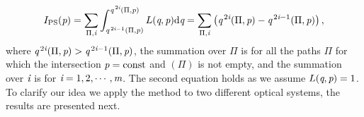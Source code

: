 \begin{equation}
I_{\textrm{PS}}(\textit{p}) = \sum_{\Pi, \textit{i} }\int_{\textit{q}^{\,2\textit{i}-1}(\Pi, \textit{p})}^{\textit{q}^{\,2\textit{i}}( \Pi, \textit{p})}L(\textit{q}, \textit{p})\textrm{d}\textit{q} =
 \sum_{\Pi, \textit{i}}\big(\textit{q}^{\,2\textit{i}}(\Pi, \textit{p})-
\textit{q}^{\,2\textit{i}-1}( \Pi, \textit{p})\big)\,,
\label{eq:Ips}
\end{equation}
where $\textit{q}^{\,2\textit{i}}( \Pi, \textit{p})>\textit{q}^{\,2\textit{i}-1}( \Pi, \textit{p})$, the summation over $\Pi$ is for all the paths $\Pi$ for which the intersection $\textit{p} = \textrm{const}$ and $(\Pi)$ is not empty, and the summation over $\textit{i}$ is for $\textit{i} = 1,2, \cdots, \textit{m}$. The second equation holds as we assume $L(\textit{q}, \textit{p})=1$.\\ \indent
To clarify our idea we apply the method to two different optical systems, the results are presented next.
